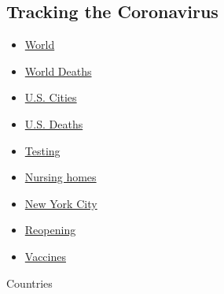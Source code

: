 \hypertarget{tracking-the-coronavirus}{%
\subsection{Tracking the Coronavirus}\label{tracking-the-coronavirus}}

\begin{itemize}
\tightlist
\item
  \href{https://www.nytimes.com/interactive/2020/world/coronavirus-maps.html}{World}
\item
  \href{https://www.nytimes.com/interactive/2020/04/21/world/coronavirus-missing-deaths.html}{World
  Deaths}
\item
  \href{https://www.nytimes.com/interactive/2020/04/23/upshot/five-ways-to-monitor-coronavirus-outbreak-us.html}{U.S.
  Cities}
\item
  \href{https://www.nytimes.com/interactive/2020/05/05/us/coronavirus-death-toll-us.html}{U.S.
  Deaths}
\item
  \href{https://www.nytimes.com/interactive/2020/us/coronavirus-testing.html}{Testing}
\item
  \href{https://www.nytimes.com/interactive/2020/us/coronavirus-nursing-homes.html}{Nursing
  homes}
\item
  \href{https://www.nytimes.com/interactive/2020/nyregion/new-york-city-coronavirus-cases.html}{New
  York City}
\item
  \href{https://www.nytimes.com/interactive/2020/us/states-reopen-map-coronavirus.html}{Reopening}
\item
  \href{https://www.nytimes.com/interactive/2020/science/coronavirus-vaccine-tracker.html}{Vaccines}
\end{itemize}

Countries

